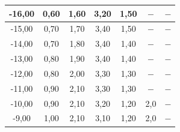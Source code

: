 \documentclass{article}
\begin{document}
\begin{table}[!ht]
\begin{tabular}{|c|c|c|c||c|c|c|}
-16,00                                                                                                             & 0,60                           & 1,60                          & 3,20                            & 1,50                           & $-$                           & $-$                             \\ \hline
-15,00                                                                                                             & 0,70                           & 1,70                          & 3,40                            & 1,50                           & $-$                           & $-$                             \\ \hline
-14,00                                                                                                             & 0,70                           & 1,80                          & 3,40                            & 1,40                           & $-$                           & $-$                             \\ \hline
-13,00                                                                                                             & 0,80                           & 1,90                          & 3,40                            & 1,40                           & $-$                           & $-$                             \\ \hline
-12,00                                                                                                             & 0,80                           & 2,00                          & 3,30                            & 1,30                           & $-$                           & $-$                             \\ \hline
-11,00                                                                                                             & 0,90                           & 2,10                          & 3,30                            & 1,30                           & $-$                           & $-$                             \\ \hline
-10,00                                                                                                             & 0,90                           & 2,10                          & 3,20                            & 1,20                           & 2,0                           & $-$                             \\ \hline
-9,00                                                                                                              & 1,00                           & 2,10                          & 3,10                            & 1,20                           & 2,0                           & $-$                             \\ \hline

\end{tabular}
\end{table}
\end{document}
